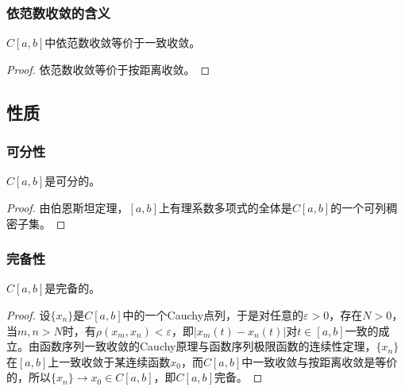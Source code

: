 \subsubsection{依范数收敛的含义}
\begin{theorem}
	$C[a,b]$中依范数收敛等价于一致收敛。
\end{theorem}
\begin{proof}
	依范数收敛等价于按距离收敛。
\end{proof}


\subsection{性质}
\subsubsection{可分性}
\begin{theorem}
	$C[a,b]$是可分的。
\end{theorem}
\begin{proof}
	由伯恩斯坦定理，$[a,b]$上有理系数多项式的全体是$C[a,b]$的一个可列稠密子集。
\end{proof}
\subsubsection{完备性}
\begin{theorem}
	$C[a,b]$是完备的。
\end{theorem}
\begin{proof}
	设$\{x_n\}$是$C[a,b]$中的一个Cauchy点列，于是对任意的$\varepsilon>0$，存在$N>0$，当$m,n>N$时，有$\rho(x_m,x_n)<\varepsilon$，即$|x_m(t)-x_n(t)|$对$t\in[a,b]$一致的成立。由函数序列一致收敛的Cauchy原理与函数序列极限函数的连续性定理，$\{x_n\}$在$[a,b]$上一致收敛于某连续函数$x_0$，而$C[a,b]$中一致收敛与按距离收敛是等价的，所以$\{x_n\}\to x_0\in C[a,b]$，即$C[a,b]$完备。
\end{proof}